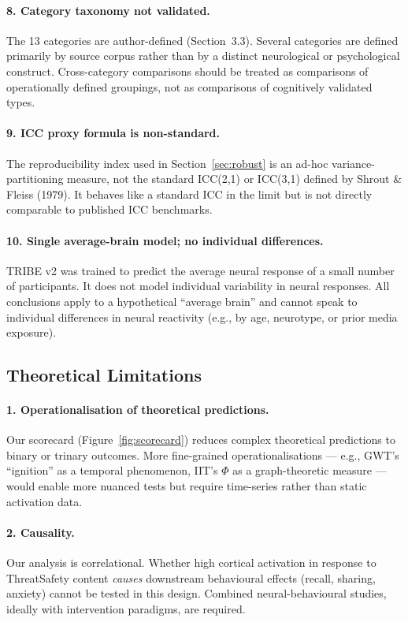 \documentclass[11pt,letterpaper]{article}
\begin{document}
\paragraph{8. Category taxonomy not validated.} The 13 categories are author-defined (Section~3.3). Several categories are defined primarily by source corpus rather than by a distinct neurological or psychological construct. Cross-category comparisons should be treated as comparisons of operationally defined groupings, not as comparisons of cognitively validated types.

\paragraph{9. ICC proxy formula is non-standard.} The reproducibility index used in Section~\ref{sec:robust} is an ad-hoc variance-partitioning measure, not the standard ICC(2,1) or ICC(3,1) defined by Shrout \& Fleiss (1979). It behaves like a standard ICC in the limit but is not directly comparable to published ICC benchmarks.

\paragraph{10. Single average-brain model; no individual differences.} TRIBE v2 was trained to predict the average neural response of a small number of participants. It does not model individual variability in neural responses. All conclusions apply to a hypothetical ``average brain'' and cannot speak to individual differences in neural reactivity (e.g., by age, neurotype, or prior media exposure).

\subsection{Theoretical Limitations}

\paragraph{1. Operationalisation of theoretical predictions.} Our scorecard (Figure~\ref{fig:scorecard}) reduces complex theoretical predictions to binary or trinary outcomes. More fine-grained operationalisations --- e.g., GWT's ``ignition'' as a temporal phenomenon, IIT's $\Phi$ as a graph-theoretic measure --- would enable more nuanced tests but require time-series rather than static activation data.

\paragraph{2. Causality.} Our analysis is correlational. Whether high cortical activation in response to ThreatSafety content \textit{causes} downstream behavioural effects (recall, sharing, anxiety) cannot be tested in this design. Combined neural-behavioural studies, ideally with intervention paradigms, are required.
\end{document}
